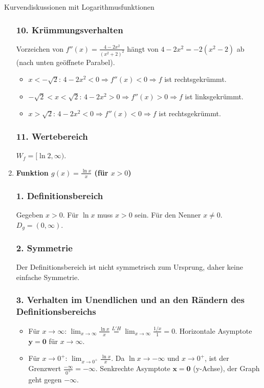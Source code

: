 \begin{loesungsumgebung}{Kurvendiskussionen mit Logarithmusfunktionen}
\begin{enumerate}[label=(\alph*)]
    \subsubsection*{10. Krümmungsverhalten}
    Vorzeichen von $f''(x)=\frac{4-2x^2}{(x^2+2)^2}$ hängt von $4-2x^2 = -2(x^2-2)$ ab (nach unten geöffnete Parabel).
    \begin{itemize}
        \item $x < -\sqrt{2}$: $4-2x^2 < 0 \Rightarrow f''(x) < 0 \Rightarrow f$ ist rechtsgekrümmt.
        \item $-\sqrt{2} < x < \sqrt{2}$: $4-2x^2 > 0 \Rightarrow f''(x) > 0 \Rightarrow f$ ist linksgekrümmt.
        \item $x > \sqrt{2}$: $4-2x^2 < 0 \Rightarrow f''(x) < 0 \Rightarrow f$ ist rechtsgekrümmt.
    \end{itemize}

    \subsubsection*{11. Wertebereich}
    $W_f = [\ln 2, \infty)$.

    \item \textbf{Funktion $g(x) = \frac{\ln x}{x}$ (für $x>0$)}

    \subsubsection*{1. Definitionsbereich}
    Gegeben $x>0$. Für $\ln x$ muss $x>0$ sein. Für den Nenner $x \neq 0$.
    $D_g = (0, \infty)$.

    \subsubsection*{2. Symmetrie}
    Der Definitionsbereich ist nicht symmetrisch zum Ursprung, daher keine einfache Symmetrie.

    \subsubsection*{3. Verhalten im Unendlichen und an den Rändern des Definitionsbereichs}
    \begin{itemize}
        \item Für $x \to \infty$: $\lim_{x \to \infty} \frac{\ln x}{x} \stackrel{L'H}{=} \lim_{x \to \infty} \frac{1/x}{1} = 0$.
        Horizontale Asymptote $\mathbf{y=0}$ für $x \to \infty$.
        \item Für $x \to 0^+$: $\lim_{x \to 0^+} \frac{\ln x}{x}$. Da $\ln x \to -\infty$ und $x \to 0^+$, ist der Grenzwert $\frac{-\infty}{0^+} = -\infty$.
        Senkrechte Asymptote $\mathbf{x=0}$ (y-Achse), der Graph geht gegen $-\infty$.
    \end{itemize}


\end{enumerate}
\end{loesungsumgebung}
